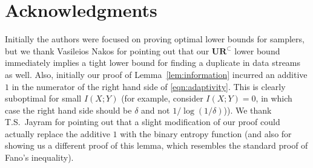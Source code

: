 \documentclass[11pt]{article}
\newcommand{\ur}{\mathbf{UR}\xspace}
\begin{document}
\newpage






\section*{Acknowledgments}
Initially the authors were focused on proving optimal lower bounds for samplers, but we thank Vasileios Nakos for pointing out that our $\ur^\subset$ lower bound immediately implies a tight lower bound for finding a duplicate in data streams as well. Also, initially our proof of Lemma~\ref{lem:information} incurred an additive $1$ in the numerator of the right hand side of \eqref{eqn:adaptivity}. This is clearly suboptimal for small $I(X; Y)$ (for example, consider $I(X; Y) = 0$, in which case the right hand side should be $\delta$ and not $1/\log(1/\delta)$)). We thank T.S.\ Jayram for pointing out that a slight modification of our proof could actually replace the additive $1$ with the binary entropy function (and also for showing us a different proof of this lemma, which resembles the standard proof of Fano's inequality).




\appendix


\end{document}
